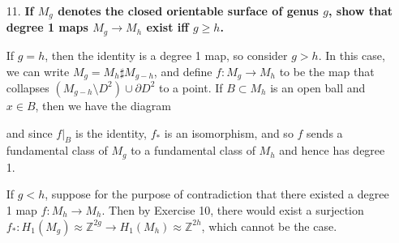 \documentclass[12pt]{article}
\newcommand{\iso}{\approx}
\begin{document}
\begin{enumerate}
    \item[11.]
        \boldmath\textbf{If $M_g$ denotes the closed orientable surface of genus $g$, show that degree 1 maps $M_g \to M_h$ exist iff $g \geq h$.
        }\unboldmath \par
        If $g = h$, then the identity is a degree 1 map, so consider $g > h$. In this case, we can write $M_g = M_h \sharp M_{g - h}$, and define $f : M_g \to M_h$ to be the map that collapses $(M_{g - h} \setminus D^2) \cup \partial D^2$ to a point. If $B \subset M_h$ is an open ball and $x \in B$, then we have the diagram
        \begin{center}
        \end{center}
        and since $f|_B$ is the identity, $f_*$ is an isomorphism, and so $f$ sends a fundamental class of $M_g$ to a fundamental class of $M_h$ and hence has degree 1. \par
        If $g < h$, suppose for the purpose of contradiction that there existed a degree 1 map $f : M_h \to M_h$. Then by Exercise 10, there would exist a surjection $f_* : H_1(M_g) \iso \mathbb{Z}^{2g} \to H_1(M_h) \iso \mathbb{Z}^{2h}$, which cannot be the case.
\end{enumerate}
\end{document}
